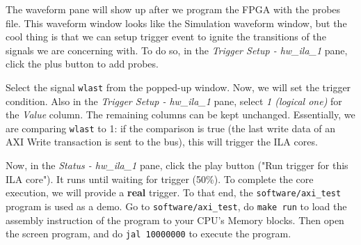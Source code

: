 \documentclass[11pt]{article}
\begin{document}
The waveform pane will show up after we program the FPGA with the probes file. This waveform window looks like the Simulation waveform window, but the cool thing is that we can setup trigger event to ignite the transitions of the signals we are concerning with. To do so, in the \emph{Trigger Setup - hw\_ila\_1} pane, click the plus button to add probes.

\begin{center}
\end{center}

Select the signal \verb|wlast| from the popped-up window. Now, we will set the trigger condition. Also in the \emph{Trigger Setup - hw\_ila\_1} pane, select \emph{1 (logical one)} for the \emph{Value} column. The remaining columns can be kept unchanged. Essentially, we are comparing \verb|wlast| to 1: if the comparison is true (the last write data of an AXI Write transaction is sent to the bus), this will trigger the ILA cores.

\begin{center}
\end{center}

Now, in the \emph{Status - hw\_ila\_1} pane, click the play button ("Run trigger for this ILA core"). It runs until waiting for trigger (50\%). To complete the core execution, we will provide a \textbf{real} trigger. To that end, the \verb|software/axi_test| program is used as a demo. Go to \verb|software/axi_test|, do \texttt{make run} to load the assembly instruction of the program to your CPU's Memory blocks. Then open the screen program, and do \texttt{jal 10000000} to execute the program.
\end{document}
